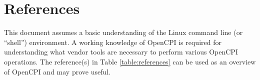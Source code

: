 \tableofcontents

\newpage

\section{References}

	This document assumes a basic understanding of the Linux command line (or ``shell'') environment. A working knowledge of OpenCPI is required for understanding what vendor tools are necessary to perform various OpenCPI operations.
The reference(s) in Table \ref{table:references} can be used as an overview of OpenCPI and may prove useful.
\def\refcapbottom{}
\def\myreferences{
\hline
HDL Development Guide &
\githubio{OpenCPI\_HDL\_Development\_Guide.pdf} \\
}


